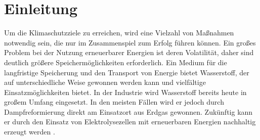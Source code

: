 \chapter{Einleitung}
Um die Klimaschutzziele zu erreichen, wird eine Vielzahl von Maßnahmen notwendig sein, die nur im Zusammenspiel zum Erfolg führen können. Ein großes Problem bei der Nutzung erneuerbarer Energien ist deren Volatilität, daher sind deutlich größere Speichermöglichkeiten erforderlich. Ein Medium für die langfristige Speicherung und den Transport von Energie bietet Wasserstoff, der auf unterschiedliche Weise gewonnen werden kann und vielfältige Einsatzmöglichkeiten bietet. In der Industrie wird Wasserstoff bereits heute in großem Umfang eingesetzt. In den meisten Fällen wird er jedoch durch Dampfreformierung direkt am Einsatzort aus Erdgas gewonnen. Zukünftig kann er durch den Einsatz von Elektrolysezellen mit erneuerbaren Energien nachhaltig erzeugt werden \cite{Elektrolyse}. 

